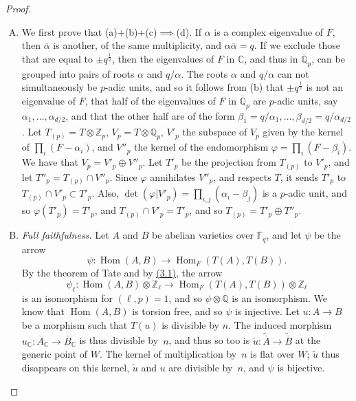 \documentclass{article}
\newcommand{\FF}{\mathbb{F}}
\newcommand{\ZZ}{\mathbb{Z}}
\newcommand{\QQ}{\mathbb{Q}}
\newcommand{\CC}{\mathbb{C}}
\DeclareMathOperator{\Hom}{Hom}
\begin{document}
\begin{proof}
  \begin{enumerate}[(A)]
    \item We first prove that (a)+(b)+(c)$\implies$(d).
      If $\alpha$ is a complex eigenvalue of $F$, then $\overline{\alpha}$ is another, of the same multiplicity, and $\alpha\overline{\alpha}=q$.
      If we exclude those that are equal to $\pm q^{\frac12}$, then the eigenvalues of $F$ in $\CC$, and thus in $\overline{\QQ}_p$, can be grouped into pairs of roots $\alpha$ and $q/\alpha$.
      The roots $\alpha$ and $q/\alpha$ can not simultaneously be $p$-adic units, and so it follows from (b) that $\pm q^{\frac12}$ is not an eigenvalue of $F$, that half of the eigenvalues of $F$ in $\overline{\QQ}_p$ are $p$-adic units, say $\alpha_1,\ldots,\alpha_{d/2}$, and that the other half are of the form $\beta_1=q/\alpha_1,\ldots,\beta_{d/2}=q/\alpha_{d/2}$.
      Let $T_{(p)}=T\otimes\ZZ_p$, $V_p=T\otimes\QQ_p$, $V'_p$ the subspace of $V_p$ given by the kernel of $\prod_i(F-\alpha_i)$, and $V''_p$ the kernel of the endomorphism $\varphi=\prod_i(F-\beta_i)$.
      We have that $V_p=V'_p\oplus V''_p$.
      Let $T'_p$ be the projection from $T_{(p)}$ to $V'_p$, and let $T''_p=T_{(p)}\cap V''_p$.
      Since $\varphi$ annihilates $V''_p$, and respects $T$, it sends $T'_p$ to $T_{(p)}\cap V'_p\subset T'_p$.
      Also, $\det(\varphi|V'_p)=\prod_{i,j}(\alpha_i-\beta_j)$ is a $p$-adic unit, and so $\varphi(T'_p)=T'_p$, and $T_{(p)}\cap V'_p=T'_p$, and so $T_{(p)}=T'_p\oplus T''_p$.
    \item \emph{Full faithfulness.}
      Let $A$ and $B$ be abelian varieties over $\FF_q$, and let $\psi$ be the arrow
      \[
        \psi\colon \Hom(A,B) \to \Hom_F(T(A),T(B)).
      \]
      By the theorem of Tate \cite{7} and by \hyperref[3.1]{(3.1)}, the arrow
      \[
        \psi_\ell\colon \Hom(A,B)\otimes\ZZ_\ell \to \Hom_F(T(A),T(B))\otimes\ZZ_\ell
      \]
      is an isomorphism for $(\ell,p)=1$, and so $\psi\otimes\QQ$ is an isomorphism.
      We know that $\Hom(A,B)$ is torsion free, and so $\psi$ is injective.
      Let $u\colon A\to B$ be a morphism such that $T(u)$ is divisible by $n$.
      The induced morphism $u_\CC\colon\overline{A}_\CC\to\overline{B}_\CC$ is thus divisible by~$n$, and thus so too is $\widetilde{u}\colon\widetilde{\overline{A}}\to\widetilde{\overline{B}}$ at the generic point of $W$.
      The kernel of multiplication by~$n$ is flat over $W$;
      $\widetilde{u}$ thus disappears on this kernel, $\widetilde{u}$ and $u$ are divisible by~$n$, and $\psi$ is bijective.

\end{enumerate}
\end{proof}
\end{document}
